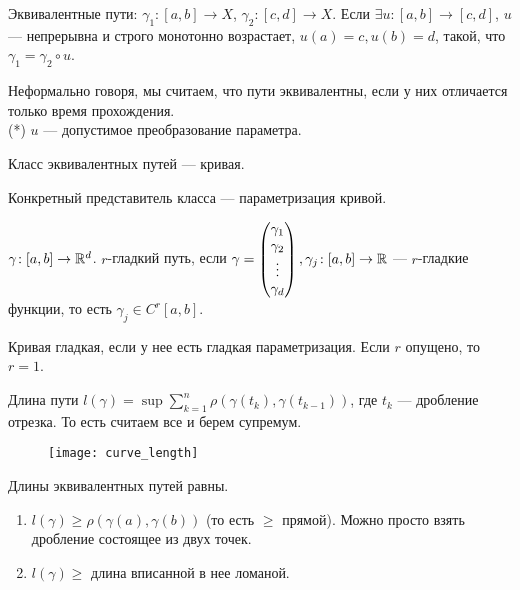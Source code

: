\begin{definition}
    Эквивалентные пути: $\gamma_1\!:[a, b] \to X$, $\gamma_2\!: [c,d] \to X$. Если  $\exists u\!:[a, b] \to [c, d]$,  $u$ --- непрерывна и строго монотонно возрастает,  $u(a) = c, u(b) = d$, такой, что  $\gamma_1 = \gamma_2 \circ u$.

    Неформально говоря, мы считаем, что пути эквивалентны, если у них отличается только время прохождения.\\
    (*) $u$ --- допустимое преобразование параметра.
\end{definition}
\begin{definition}
    Класс эквивалентных путей --- кривая.

    Конкретный представитель класса --- параметризация кривой.
\end{definition}
\begin{definition}
    $\gamma\!: [a,b] \to \mathbb{R}^d$.  $r$-гладкий путь, если  $\gamma = \begin{pmatrix} \gamma_1 \\ \gamma_2 \\ \vdots \\ \gamma_d \end{pmatrix}, \gamma_j\!:[a,b] \to \mathbb{R}$ --- $r$-гладкие функции, то есть  $\gamma_j \in C^r[a,b]$.

    Кривая гладкая, если у нее есть гладкая параметризация. Если  $r$ опущено, то  $r=1$.
\end{definition}
\begin{definition}
    Длина пути $l(\gamma) = \sup \sum\limits_{k=1}^n \rho(\gamma(t_k), \gamma(t_{k-1}))$, где  $t_k$ --- дробление отрезка. То есть считаем все и берем супремум.
    \begin{figure}[h!]
        \texttt{[image: curve\_length]}
    \end{figure}
\end{definition}
\begin{remark}
    Длины эквивалентных путей равны.
\end{remark}
\begin{properties}
    \begin{enumerate}
        \item $l(\gamma) \ge \rho(\gamma(a), \gamma(b))$ (то есть $\ge$ прямой). Можно просто взять дробление состоящее из двух точек.
        \item $l(\gamma) \ge$ длина вписанной в нее ломаной.
    \end{enumerate}
\end{properties}
